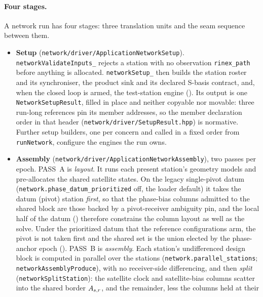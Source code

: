 \documentclass[main.tex]{subfiles}
\begin{document}
\paragraph{Four stages.}
A network run has four stages: three translation units and the seam
sequence between them.
\begin{itemize}[leftmargin=*, itemsep=1pt]
\item \textbf{Setup} (\texttt{network/driver/ApplicationNetworkSetup}).
      \texttt{networkValidateInputs\_} rejects a station with no
      observation \texttt{rinex\_path} before anything is allocated.
      \texttt{networkSetup\_} then builds the station roster and its
      synchroniser, the product sink and its declared S-basis contract,
      and, when the closed loop is armed, the test-station engine
      (). Its output is one
      \texttt{NetworkSetupResult}, filled in place and neither copyable
      nor movable: three run-long references pin its member addresses,
      so the member declaration order in that header
      (\texttt{network/driver/SetupResult.hpp}) is normative. Further
      setup builders, one per concern and called in a fixed order from
      \texttt{runNetwork}, configure the engines the run owns.
\item \textbf{Assembly} (\texttt{network/driver/ApplicationNetworkAssembly}),
      two passes per epoch. PASS~A is \emph{layout}. It runs each present
      station's geometry models and pre-allocates the shared satellite
      states. On the legacy single-pivot datum
      (\texttt{network.phase\_datum\_prioritized} off, the loader default)
      it takes the datum (pivot) station \emph{first}, so that the
      phase-bias columns admitted to the shared block are those backed
      by a pivot-receiver ambiguity pin, and the local half of the datum
      () therefore constrains the column layout as
      well as the solve. Under the prioritized datum that the reference
      configurations arm, the pivot is not taken first and the shared set
      is the union elected by the phase-anchor epoch
      (). PASS~B is \emph{assembly}. Each
      station's undifferenced design block is computed in parallel over the
      stations (\texttt{network.parallel\_stations};
      \texttt{networkAssemblyProduce}), with no
      receiver-side differencing, and then \emph{split}
      (\texttt{networkSplitStation}): the satellite clock and
      satellite-bias columns scatter into the shared border
      $A_{s,r}$, and the remainder, less the columns held at their

\end{itemize}
\end{document}
